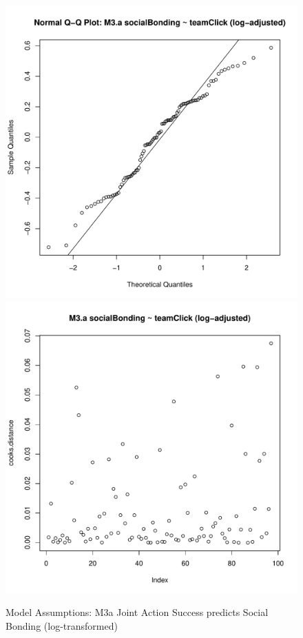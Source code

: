 \documentclass[12pt]{report}
\begin{document}
{\begin{figure}[htbp]
  \includegraphics[scale =.4]{../images/MLM3aLogQQNorm.pdf}
  \includegraphics[scale =.4]{../images/MLM3aLogCooksD.pdf}
  \caption{Model Assumptions: M3a Joint Action Success predicts Social Bonding (log-transformed)}
  \label{fig:MLM3aLogAssumptions}
\end{figure}








}
\end{document}
